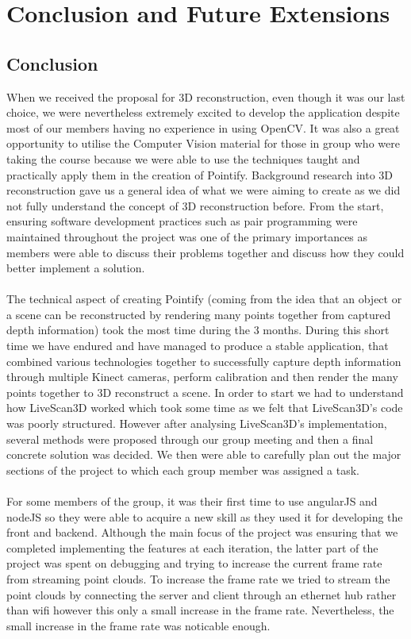 \documentclass{article}
\begin{document}
\section{Conclusion and Future Extensions}
\subsection{Conclusion}

When we received the proposal for 3D reconstruction, even though it was our last choice, we were nevertheless extremely excited to develop the application despite most of our members having no experience in using OpenCV. It was also a great opportunity to utilise the Computer Vision material for those in group who were taking the course because we were able to use the techniques taught and practically apply them in the creation of Pointify. Background research into 3D reconstruction gave us a general idea of what we were aiming to create as we did not fully understand the concept of 3D reconstruction before. From the start, ensuring software development practices such as pair programming were maintained throughout the project was one of the primary importances as members were able to discuss their problems together and discuss how they could better implement a solution.
\\\\
The technical aspect of creating Pointify (coming from the idea that an object or a scene can be reconstructed by rendering many points together from captured depth information) took the most time during the 3 months. During this short time we have endured and have managed to produce a stable application, that combined various technologies together to successfully capture depth information through multiple Kinect cameras, perform calibration and then render the many points together to 3D reconstruct a scene. In order to start we had to understand how LiveScan3D worked which took some time as we felt that LiveScan3D's code was poorly structured. However after analysing LiveScan3D's implementation, several methods were proposed through our group meeting and then a final concrete solution was decided. We then were able to carefully plan out the major sections of the project to which each group member was assigned a task.
\\\\
For some members of the group, it was their first time to use angularJS and nodeJS so they were able to acquire a new skill as they used it for developing the front and backend. Although the main focus of the project was ensuring that we completed implementing the features at each iteration, the latter part of the project was spent on debugging and trying to increase the current frame rate from streaming point clouds. To increase the frame rate we tried to stream the point clouds by connecting the server and client through an ethernet hub rather than wifi however this only a small increase in the frame rate. Nevertheless, the small increase in the frame rate was noticable enough. 
\end{document}
